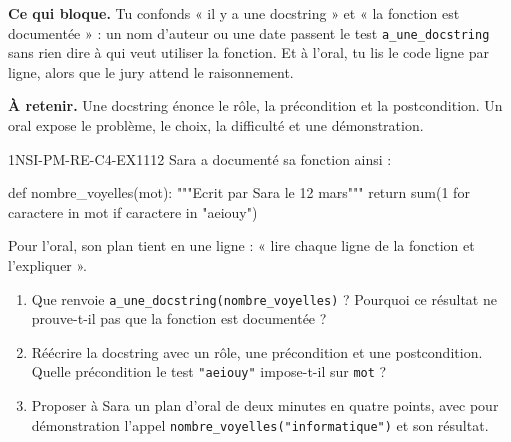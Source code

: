 

\textbf{Ce qui bloque.} Tu confonds « il y a une docstring » et « la fonction est
documentée » : un nom d'auteur ou une date passent le test \lstinline{a_une_docstring} sans
rien dire à qui veut utiliser la fonction. Et à l'oral, tu lis le code ligne par ligne, alors
que le jury attend le raisonnement.

\textbf{À retenir.} Une docstring énonce le rôle, la précondition et la postcondition. Un
oral expose le problème, le choix, la difficulté et une démonstration.

\begin{exercice}{1NSI-PM-RE-C4-EX1}{1}{12}
Sara a documenté sa fonction ainsi :
\begin{python}
def nombre_voyelles(mot):
    """Ecrit par Sara le 12 mars"""
    return sum(1 for caractere in mot if caractere in "aeiouy")
\end{python}
Pour l'oral, son plan tient en une ligne : « lire chaque ligne de la fonction et l'expliquer ».
\begin{enumerate}
  \item Que renvoie \lstinline{a_une_docstring(nombre_voyelles)} ? Pourquoi ce résultat ne
        prouve-t-il pas que la fonction est documentée ?
  \item Réécrire la docstring avec un rôle, une précondition et une postcondition. Quelle
        précondition le test \lstinline{"aeiouy"} impose-t-il sur \lstinline{mot} ?
  \item Proposer à Sara un plan d'oral de deux minutes en quatre points, avec pour
        démonstration l'appel \lstinline{nombre_voyelles("informatique")} et son résultat.
\end{enumerate}
\end{exercice}

%
